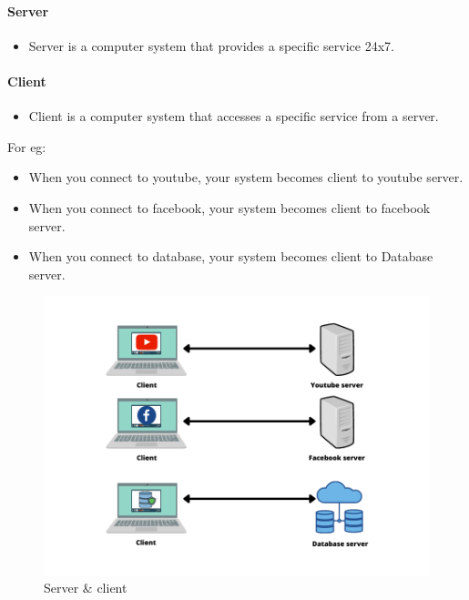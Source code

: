 \setlength{\columnsep}{3pt}
\begin{flushleft}

\bigskip
\paragraph{Server}
\begin{itemize}
	\item Server is a computer system that provides a specific service 24x7.
\end{itemize}

\paragraph{Client}
\begin{itemize}
	\item Client is a computer system that accesses a specific service from a server.
\end{itemize}

For eg: 
\begin{itemize}
	\item When you connect to youtube, your system becomes client to youtube server.
	\item When you connect to facebook, your system becomes client to facebook server.
	\item When you connect to database, your system becomes client to Database server.
\end{itemize}

	\begin{figure}[h!]
	\centering
	\includegraphics[scale=.5]{content/chapter19/images/server-client.png}
	\caption{Server \& client}
	\label{fig:ssh_server_client}
\end{figure}


\end{flushleft}
\newpage


